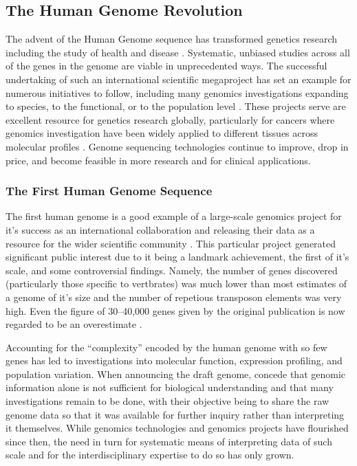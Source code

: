 \subsection{The Human Genome Revolution}
The advent of the Human Genome sequence \citep{Lander2001} has transformed genetics research including the study of health and disease \citep{Peltonen2001, Lander2011}. Systematic, unbiased studies across all of the genes in the genome are viable in unprecedented ways. The successful undertaking of such an international scientific megaproject has set an example for numerous initiatives to follow, including many genomics investigations expanding to species, to the functional, or to the population level \citep{Collins2003}. These projects serve are excellent resource for genetics research globally, particularly for cancers where genomics investigation have been widely applied to different tissues across molecular profiles \citet{Bamford2004, ICGC2011, TCGA2013PAN} . Genome sequencing technologies continue to improve, drop in price, and become feasible in more research and for clinical applications.

\subsubsection{The First Human Genome Sequence}
The first human genome is a good example of a large-scale genomics project for it's success as an international collaboration and releasing their data as a resource for the wider scientific community \citep{Lander2001, Collins2003}. This particular project generated significant public interest due to it being a landmark achievement, the first of it's scale, and some controversial findings. Namely, the number of genes discovered (particularly those specific to vertbrates) was much lower than most estimates of a genome of it's size and the number of repetious transposon elements was very high. Even the figure of 30--40,000 genes given by the original publication is now regarded to be an overestimate \citep{IHGSC2004, Ezkurdia2014}. 

Accounting for the ``complexity'' encoded by the human genome with so few genes has led to investigations into molecular function, expression profiling, and population variation. When announcing the draft genome, \citet{Lander2001} concede that genomic information alone is not sufficient for biological understanding and that many investigations remain to be done, with their objective being to share the raw genome data so that it was available for further inquiry rather than interpreting it themselves. While genomics technologies and genomics projects have flourished since then, the need in turn for systematic means of interpreting data of such scale and for the interdisciplinary expertise to do so has only grown. 

